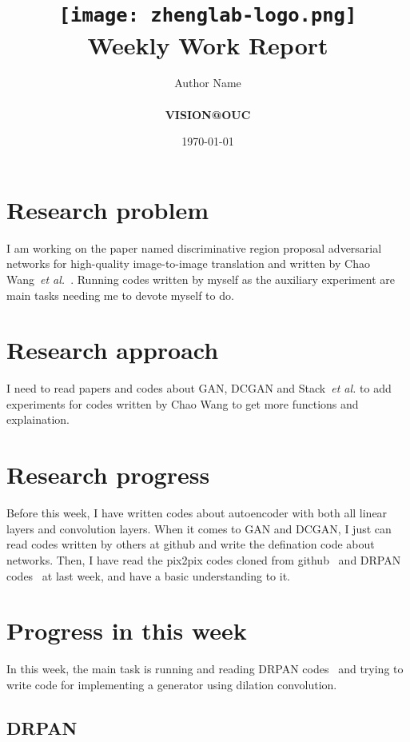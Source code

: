 \documentclass[a4paper]{article}
\title{
    \vspace*{1in}
    \texttt{[image: zhenglab-logo.png]}\\
    \vspace*{1.2in}
    \textbf{\huge Weekly Work Report}
    \vspace{0.2in}
}
\author{Author Name \\
    \vspace*{0.5in} \\
    \textbf{VISION@OUC} \\
    \vspace*{1in}
}
\date{\today}
\begin{document}
\maketitle
\setcounter{page}{0}
\thispagestyle{empty}
\newpage
\section{Research problem}

I am working on the paper named discriminative region proposal adversarial networks for high-quality image-to-image translation and written by Chao Wang~\emph{et al.}~\cite{dis}. Running codes written by myself as the auxiliary experiment are main tasks needing me to devote myself to do.

\section{Research approach}

I need to read papers and codes about GAN, DCGAN and Stack~\emph{et al.} to add experiments for codes written by Chao Wang to get more functions and explaination.

\section{Research progress}

Before this week, I have written codes about autoencoder with both all linear layers and convolution layers. When it comes to GAN and DCGAN, I just can read codes written by others at github and write the defination code about networks.
Then, I have read the pix2pix codes cloned from github~\cite{Git} and DRPAN codes~\cite{god} at last week, and have a basic understanding to it.

\section{Progress in this week}

In this week, the main task is running and reading DRPAN codes~\cite{god} and trying to write code for implementing a generator using dilation convolution. 

\subsection{DRPAN}
\end{document}
